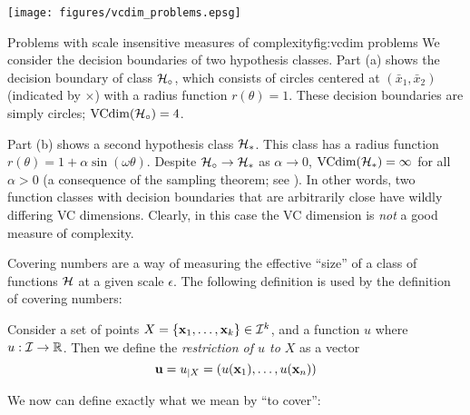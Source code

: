 \begin{linefigure}
\begin{center}
\texttt{[image: figures/vcdim\_problems.epsg]}
\end{center}
\begin{capt}{Problems with scale insensitive measures of
complexity}{fig:vcdim problems}
We consider the decision boundaries of two hypothesis classes.  Part
(a) shows the decision boundary of class $\mathcal{H}_{\circ}$,
which consists of circles centered at $(\bar{x}_1, \bar{x}_2)$
(indicated by $\times$) with a radius function $r(\theta) = 1$.  These
decision boundaries are simply circles; $\mathrm{VCdim}(\mathcal{H}_{\circ}) = 4$.

Part (b) shows a second hypothesis class $\mathcal{H}_{\ast}$.  This class
has a radius function $r(\theta) = 1 + \alpha \sin(\omega \theta)$.
Despite $\mathcal{H}_{\circ} \rightarrow \mathcal{H}_{\ast}$ as $\alpha
\rightarrow 0$, $\mathrm{VCdim}(\mathcal{H}_{\ast}) = \infty$ for all $\alpha >
0$ (a consequence of the sampling theorem; see \cite{Cherkassky98}).
In other words, two function classes with 
decision boundaries that are arbitrarily close have wildly differing
VC dimensions.  Clearly, in this case the VC dimension is \emph{not} a
good measure of complexity.
\end{capt}
\end{linefigure}

Covering numbers are a way of measuring the effective ``size'' of a
class of functions $\mathcal{H}$ at a given scale $\epsilon$.  The following
definition is used by the definition of covering numbers:

\begin{definition}
\label{def:restriction}
Consider a set of points $X = \{\mathbf{x}_1, \ldots, \mathbf{x}_k\} \in \mathcal{I}^k$,
and a function $u$ where $u : \mathcal{I} \rightarrow \mathbb{R}$.  Then
we define the \emph{restriction of $u$ to $X$} as a vector
%
\begin{equation}
\mathbf{u} = u_{|X} = (u(\mathbf{x}_1), \ldots, u(\mathbf{x}_n))
\end{equation}
\end{definition}

We now can define exactly what we mean by ``to cover'':

